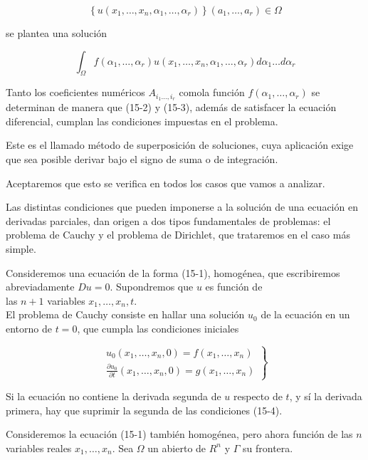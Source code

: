\documentclass[10pt]{article}
\theoremstyle{plain}
\theoremstyle{definition}
\theoremstyle{remark}
\begin{document}
$$
\left\{u\left(x_{1}, \ldots, x_{n}, \alpha_{1}, \ldots, \alpha_{r}\right)\right\}\left(a_{1}, \ldots, a_{r}\right) \in \Omega
$$

se plantea una solución


\begin{equation*}
\int_{\Omega} f\left(\alpha_{1}, \ldots, \alpha_{r}\right) u\left(x_{1}, \ldots, x_{n}, \alpha_{1}, \ldots, \alpha_{r}\right) d \alpha_{1} \ldots d \alpha_{r} \tag{15-3}
\end{equation*}


Tanto los coeficientes numéricos $A_{i_{1} \ldots, i_{r}}$ comola función $f\left(\alpha_{1}, \ldots, \alpha_{r}\right)$ se determinan de manera que (15-2) y (15-3), además de satisfacer la ecuación diferencial, cumplan las condiciones impuestas en el problema.

Este es el llamado método de superposición de soluciones, cuya aplicación exige que sea posible derivar bajo el signo de suma o de integración.

Aceptaremos que esto se verifica en todos los casos que vamos a analizar.

Las distintas condiciones que pueden imponerse a la solución de una ecuación en derivadas parciales, dan origen a dos tipos fundamentales de problemas: el problema de Cauchy y el problema de Dirichlet, que trataremos en el caso más simple.

Consideremos una ecuación de la forma (15-1), homogénea, que escribiremos abreviadamente $D u=0$. Supondremos que $u$ es función de\\
las $n+1$ variables $x_{1}, \ldots, x_{n}, t$.\\
El problema de Cauchy consiste en hallar una solución $u_{0}$ de la ecuación en un entorno de $t=0$, que cumpla las condiciones iniciales

\[
\left.\begin{array}{l}
u_{0}\left(x_{1}, \ldots, x_{n}, 0\right)=f\left(x_{1}, \ldots, x_{n}\right)  \tag{15-4}\\
\frac{\partial u_{0}}{\partial t}\left(x_{1}, \ldots, x_{n}, 0\right)=g\left(x_{1}, \ldots, x_{n}\right)
\end{array}\right\}
\]

Si la ecuación no contiene la derivada segunda de $u$ respecto de $t$, y sí la derivada primera, hay que suprimir la segunda de las condiciones (15-4).

Consideremos la ecuación (15-1) también homogénea, pero ahora función de las $n$ variables reales $x_{1}, \ldots, x_{n}$. Sea $\Omega$ un abierto de $R^{n}$ y $\Gamma$ su frontera.
\end{document}

